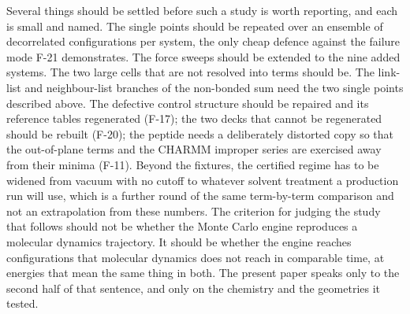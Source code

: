 Several things should be settled before such a study is worth reporting, and
each is small and named. The single points should be repeated over an ensemble
of decorrelated configurations per system, the only cheap defence against the
failure mode F-21 demonstrates. The force sweeps should be extended to the nine
added systems. The two large cells that are not resolved into terms should be.
The link-list and neighbour-list branches of the non-bonded sum need the two
single points described above. The defective control structure should be
repaired and its reference tables regenerated (F-17); the two decks that cannot
be regenerated should be rebuilt (F-20); the peptide needs a deliberately
distorted copy so that the out-of-plane terms and the CHARMM improper series
are exercised away from their minima (F-11). Beyond the fixtures, the certified
regime has to be widened from vacuum with no cutoff to whatever solvent
treatment a production run will use, which is a further round of the same
term-by-term comparison and not an extrapolation from these numbers. The
criterion for judging the study that follows should not be whether the Monte
Carlo engine reproduces a molecular dynamics trajectory. It should be whether
the engine reaches configurations that molecular dynamics does not reach in
comparable time, at energies that mean the same thing in both. The present
paper speaks only to the second half of that sentence, and only on the
chemistry and the geometries it tested.
